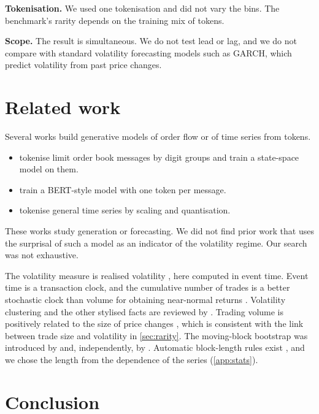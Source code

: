 \documentclass[11pt]{article}
\begin{document}
\textbf{Tokenisation.}
We used one tokenisation and did not vary the bins.
The benchmark's rarity depends on the training mix of tokens.

\textbf{Scope.}
The result is simultaneous.
We do not test lead or lag, and we do not compare with standard volatility forecasting models such as GARCH, which predict volatility from past price changes.

\section{Related work}\label{sec:related}

Several works build generative models of order flow or of time series from tokens.
\begin{itemize}
  \item \citet{nagy2023} tokenise limit order book messages by digit groups and train a state-space model on them.
  \item \citet{linna2025} train a BERT-style model with one token per message.
  \item \citet{ansari2024} tokenise general time series by scaling and quantisation.
\end{itemize}
These works study generation or forecasting.
We did not find prior work that uses the surprisal of such a model as an indicator of the volatility regime.
Our search was not exhaustive.

The volatility measure is realised volatility \citep{andersen2003}, here computed in event time.
Event time is a transaction clock, and the cumulative number of trades is a better stochastic clock than volume for obtaining near-normal returns \citep{ane2000}.
Volatility clustering and the other stylised facts are reviewed by \citet{cont2001,cont2007}.
Trading volume is positively related to the size of price changes \citep{karpoff1987}, which is consistent with the link between trade size and volatility in \cref{sec:rarity}.
The moving-block bootstrap was introduced by \citet{kunsch1989} and, independently, by \citet{liu1992}.
Automatic block-length rules exist \citep{politis2004,patton2009}, and we chose the length from the dependence of the series (\cref{app:stats}).

\section{Conclusion}
\end{document}
